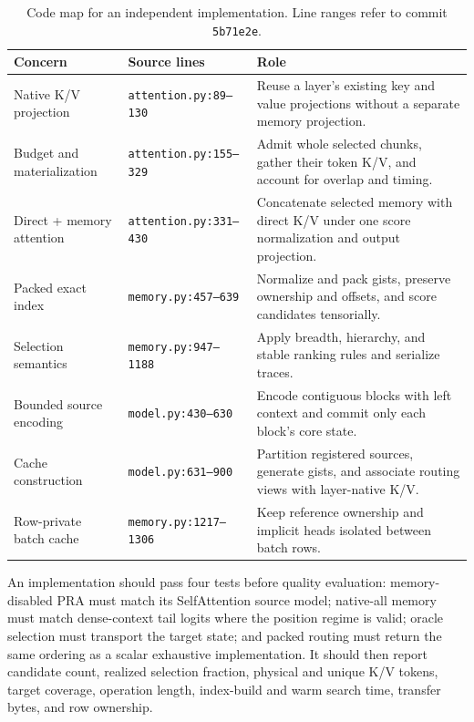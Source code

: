 \documentclass[11pt]{article}
\begin{document}
\begin{table}[H]
\centering
\small
\caption{Code map for an independent implementation. Line ranges refer to commit
\texttt{5b71e2e}.}
\label{tab:code-map}
\begin{tabularx}{\textwidth}{l l X}
\toprule
Concern & Source lines & Role \\
\midrule
Native K/V projection & \texttt{attention.py:89--130} & Reuse a layer's existing key and
value projections without a separate memory projection. \\
Budget and materialization &
  \texttt{attention.py:155--329} &
  Admit whole selected chunks,
gather their token K/V, and account for overlap and timing. \\
Direct + memory attention & \texttt{attention.py:331--430} & Concatenate selected memory
with direct K/V under one score normalization and output projection. \\
Packed exact index & \texttt{memory.py:457--639} & Normalize and pack gists, preserve
ownership and offsets, and score candidates tensorially. \\
Selection semantics &
  \texttt{memory.py:947--1188} &
  Apply breadth, hierarchy, and stable
ranking rules and serialize traces. \\
Bounded source encoding &
  \texttt{model.py:430--630} &
  Encode contiguous blocks with left
context and commit only each block's core state. \\
Cache construction & \texttt{model.py:631--900} & Partition registered sources, generate
gists, and associate routing views with layer-native K/V. \\
Row-private batch cache & \texttt{memory.py:1217--1306} & Keep reference ownership and
implicit heads isolated between batch rows. \\
\bottomrule
\end{tabularx}
\end{table}

An implementation should pass four tests before quality evaluation:
memory-disabled PRA must match its SelfAttention source model;
native-all memory must match dense-context tail logits where the position regime is
valid; oracle selection must transport the target state;
and packed routing must return the same ordering as a scalar exhaustive implementation.
It should then report candidate count, realized selection fraction,
physical and unique K/V tokens, target coverage, operation length,
index-build and warm search time, transfer bytes, and row ownership.

{\small


}
\end{document}
